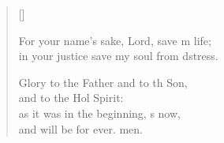\begin{verse}[\versewidth]
\begin{patverse}
    For your name’s sake, Lord, save m life;\Med\\
    in your justice save my soul from d\pointup{\i}stress.

    Glory to the Father and to th Son,\Med\\
    and to the Hol Spirit:\\
    as it was in the beginning, \pointup{\i}s now,\Med\\
    and will be for ever. men.
  \end{patverse}
  \end{verse}
